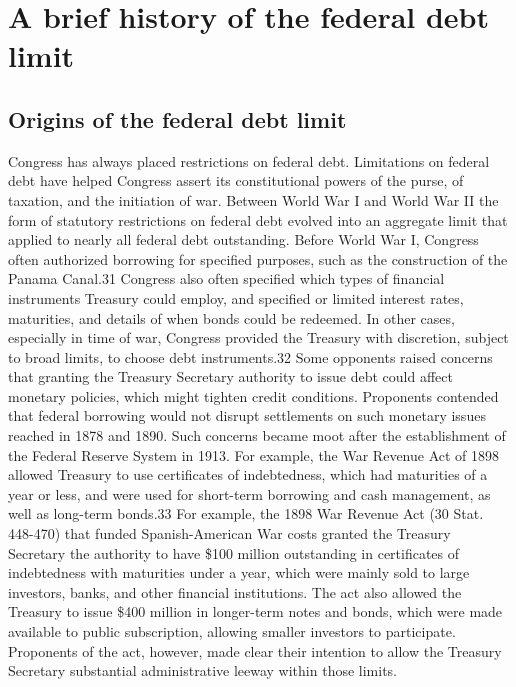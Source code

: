 \section{A brief history of the federal debt limit}
\label{sec:History}

\subsection{Origins of the federal debt limit}
Congress has always placed restrictions on federal debt. Limitations on federal debt have helped Congress assert its constitutional powers of the purse, of taxation, and the initiation of war. Between World War I and World War II the form of statutory restrictions on federal debt evolved into an aggregate limit that applied to nearly all federal debt outstanding.
\newline \newline
Before World War I, Congress often authorized borrowing for specified purposes, such as the construction of the Panama Canal.31 Congress also often specified which types of financial instruments Treasury could employ, and specified or limited interest rates, maturities, and details of when bonds could be redeemed. In other cases, especially in time of war, Congress provided the Treasury with discretion, subject to broad limits, to choose debt instruments.32 Some opponents raised concerns that granting the Treasury Secretary authority to issue debt could affect monetary policies, which might tighten credit conditions. Proponents contended that federal borrowing would not disrupt settlements on such monetary issues reached in 1878 and 1890. Such concerns became moot after the establishment of the Federal Reserve System in 1913.
\newline \newline
For example, the War Revenue Act of 1898 allowed Treasury to use certificates of indebtedness, which had maturities of a year or less, and were used for short-term borrowing and cash management, as well as long-term bonds.33 For example, the 1898 War Revenue Act (30 Stat. 448-470) that funded Spanish-American War costs granted the Treasury Secretary the authority to have \$100 million outstanding in certificates of indebtedness with maturities under a year, which were mainly sold to large investors, banks, and other financial institutions. The act also allowed the Treasury to issue \$400 million in longer-term notes and bonds, which were made available to public subscription, allowing smaller investors to participate. Proponents of the act, however, made clear their intention to allow the Treasury Secretary substantial administrative leeway within those limits.
